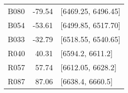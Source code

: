 \begin{tabular}{lrl}
B080 & -79.54 & [6469.25, 6496.45]\\
B054 & -53.61 & [6499.85, 6517.70]\\
B033 & -32.79 & [6518.55, 6540.65]\\
R040 & 40.31 & [6594.2, 6611.2]\\
R057 & 57.74 & [6612.05, 6628.2]\\
R087 & 87.06 & [6638.4, 6660.5]\\
\end{tabular}
